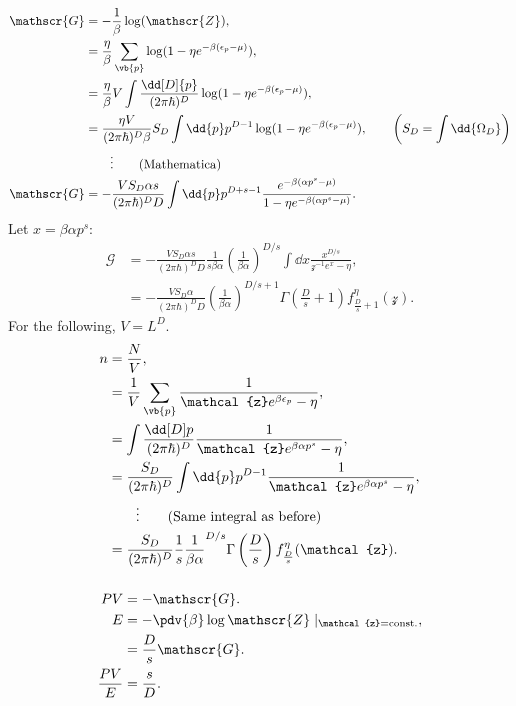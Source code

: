 \documentclass[a4paper,12pt,twoside]{article}
\begin{document}
\begin{multicols*}{2}
\subsection{}
\subsubsection{}
\begin{align}
	\mathscr{G} &= -\frac{1}{\beta} \log(\mathscr{Z}),\\
	&= \frac{\eta}{\beta} \sum_{\vb{p}} \log(1-\eta e^{-\beta(\epsilon_p - \mu)}),\\
	&= \frac{\eta}{\beta} V \int \frac{\dd[D]{p}}{(2\pi\hbar)^D} \log(1-\eta e^{-\beta(\epsilon_p - \mu)}),\\
	&= \frac{\eta V}{(2\pi\hbar)^D \beta} S_D \int \dd{p} p^{D-1} \log(1-\eta e^{-\beta(\epsilon_p - \mu)}), \qquad \left(S_D = \int \dd{\Omega_D}\right)\\
	&\qquad\vdots \qquad(\text{Mathematica})\nonumber\\
	\mathscr{G} &= -\frac{VS_D\alpha s}{(2\pi\hbar)^D D} \int \dd{p}p^{D+s-1} \frac{e^{-\beta(\alpha p^s - \mu)}}{1-\eta e^{-\beta(\alpha p^s - \mu)}}.
\end{align}
Let $x = \beta\alpha p^s$:
\begin{align}
	\mathscr{G} &= -\frac{VS_D\alpha s}{(2\pi\hbar)^D D} \frac{1}{s\beta\alpha} \left(\frac{1}{\beta\alpha}\right)^{D/s} \int \dd{x} \frac{x^{D/s}} {\mathcal{z}^{-1}e^x-\eta},\\
	&= -\frac{VS_D \alpha}{(2\pi\hbar)^D D} \left(\frac{1}{\beta \alpha}\right)^{D/s+1} \Gamma\left(\frac{D}{s}+1\right) f_{\frac{D}{s}+1}^\eta(\mathcal{z}).
\end{align}
For the following, $V = L^D$.
\begin{align}
	n &= \frac{N}{V},\\
	&= \frac{1}{V} \sum_{\vb{p}} \frac{1}{\mathcal{z}e^{\beta\epsilon_p} - \eta},\\
	&= \int \frac{\dd[D]p}{(2\pi\hbar)^D} \frac{1}{\mathcal{z}e^{\beta\alpha p^s}-\eta},\\
	&= \frac{S_D}{(2\pi\hbar)^D}\int \dd{p}p^{D-1} \frac{1}{\mathcal{z}e^{\beta\alpha p^s}-\eta},\\
	&\qquad\vdots \qquad\text{(Same integral as before)}\\
	&= \frac{S_D}{(2\pi\hbar)^D} \frac{1}{s} \frac{1}{\beta\alpha}^{D/s} \Gamma\left(\frac{D}{s}\right) f_{\frac{D}{s}}^\eta(\mathcal{z}).
\end{align}
\subsubsection{}
\begin{align}
	PV &= -\mathscr{G}.\\
	E &= -\pdv{\beta}\log{\mathscr{Z}}\mid_{\mathcal{z} = \text{const.}},\\
	&= \frac{D}{s} \mathscr{G}.\\
	\frac{PV}{E} &= \frac{s}{D}.
\end{align}

\end{multicols*}
\end{document}
